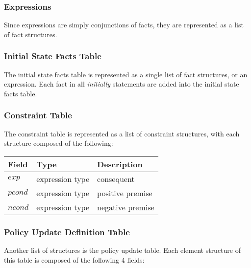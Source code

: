 \documentclass[11pt, twocolumn]{article}
\newenvironment{vquote}
  {\begin{list}{}{\leftmargin 1em}\item[]}
  {\end{list}}
\begin{document}
      \subsubsection{Expressions}

        Since expressions are simply conjunctions of facts, they are
        represented as a list of fact structures.

      \subsubsection{Initial State Facts Table}

        The initial state facts table is represented as a single list of
        fact structures, or an expression. Each fact in all {\em initially}
        statements are added into the initial state facts table.

      \subsubsection{Constraint Table}

        The constraint table is represented as a list of constraint
        structures, with each structure composed of the following:

        \begin{vquote}
          \begin{tabular}[t]{|l|l|l|}
            \hline
            \textbf{Field} & \textbf{Type} & \textbf{Description} \\
            \hline
            $exp$ & expression type & consequent \\
            \hline
            $pcond$ & expression type & positive premise \\
            \hline
            $ncond$ & expression type & negative premise \\
            \hline
          \end{tabular}
        \end{vquote}

      \subsubsection{Policy Update Definition Table}

        Another list of structures is the policy update table. Each element
        structure of this table is composed of the following 4 fields:
\end{document}
